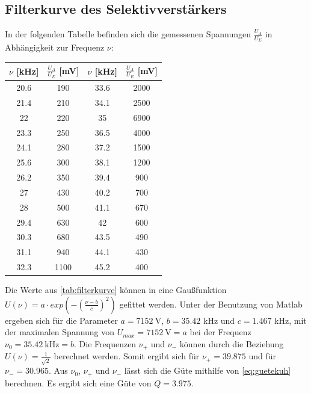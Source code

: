 \subsection{Filterkurve des Selektivverstärkers}
In der folgenden Tabelle befinden sich die gemessenen Spannungen $\frac{U_{A}}{U_{E}}$ in Abhängigkeit zur Frequenz $\nu$:
\begin{table}[H]
 \centering 
 \begin{tabular}{cccc} \toprule
 $\nu$ [kHz]& $\frac{U_{A}}{U_{E}}$ [mV] & $\nu$ [kHz]& $\frac{U_{A}}{U_{E}}$ [mV]\\  \midrule
 20.6 & 190 & 33.6 & 2000\\ 
 21.4 & 210 & 34.1 & 2500\\ 
 22   & 220 & 35   & 6900\\
 23.3 & 250 & 36.5 & 4000\\
 24.1 & 280 & 37.2 & 1500\\
 25.6 & 300 & 38.1 & 1200\\
 26.2 & 350 & 39.4 & 900\\
 27   & 430 & 40.2 & 700\\
 28   & 500 & 41.1 & 670\\
 29.4 & 630 & 42   & 600\\
 30.3 & 680 & 43.5 & 490\\
 31.1 & 940 & 44.1 & 430\\
 32.3 & 1100 & 45.2 & 400\\ \bottomrule
 \end{tabular} 
 \label{tab:filterkurve}
\end{table} 
Die Werte aus \autoref{tab:filterkurve} können in eine Gaußfunktion $U(\nu)=a\cdot exp(-(\frac{\nu-b}{c})^2)$ gefittet werden. 
Unter der Benutzung von Matlab ergeben sich für die Parameter $a=7152\ \si{\V}$, $b=35.42$ kHz und $c=1.467$ kHz, 
mit der maximalen Spannung von $U_{max}=7152\ \si{\V}=a$ bei der Frequenz $\nu_{0}=35.42\ \si{\kHz}=b$. 
Die Frequenzen $\nu_{+}$ und $\nu_{-}$ können durch die Beziehung $U(\nu)=\frac{1}{\sqrt{2}}$ berechnet werden. 
Somit ergibt sich für $\nu_{+}=39.875$ und für $\nu_{-}=30.965$. 
Aus $\nu_{0}$, $\nu_{+}$ und $\nu_{-}$ lässt sich die Güte mithilfe von \autoref{eq:guetekuh}
berechnen. Es ergibt sich eine Güte von $Q=3.975$.
